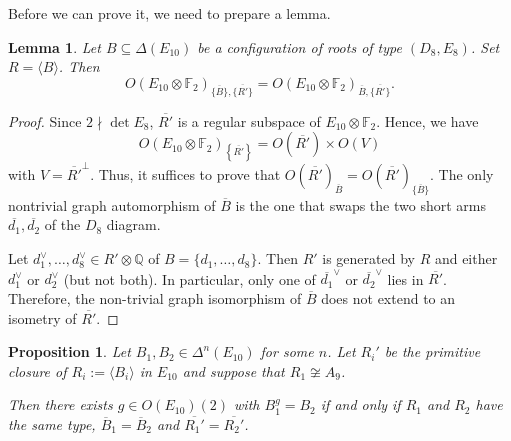 \documentclass[a4paper]{amsart}
\theoremstyle{definition}
\theoremstyle{plain}
\newtheorem{lemma}[definition]{Lemma}
\newtheorem{proposition}[definition]{Proposition}
\newcommand{\QQ}{\mathbb{Q}}
\newcommand{\FF}{\mathbb{F}}
\begin{document}
Before we can prove it, we need to prepare a lemma.
\begin{lemma}\label{lem:D8E8_stabilizer}
Let $B \subseteq \Delta(E_{10})$ be a configuration of roots of type $(D_8,E_8)$. Set $R=\langle B \rangle$.
Then 
\[O(E_{10}\otimes \FF_2)_{\{\overline{B}\},\{\overline{R'}\}}=O(E_{10}\otimes \FF_2)_{\overline{B}, \{\overline{R'}\}}.\]
\end{lemma}
\begin{proof}
Since $2 \nmid \det E_8$, $\overline{R'}$ is a regular subspace of $E_{10}\otimes \FF_2$. Hence, we have 
\[O(E_{10}\otimes \FF_2)_{\left\{\overline{R'}\right\}}=O(\overline{R'})\times O(V)\] 
with $V=\overline{R'}^\perp$. 
Thus, it suffices to prove that $O(\overline{R'})_{\overline{B}}=O(\overline{R'})_{\{\overline{B}\}}$. 
The only nontrivial graph automorphism of $\overline{B}$ is the one that swaps the two short arms $\overline{d_1},\overline{d_2}$ of the $D_8$ diagram. 
\begin{center}
\end{center}
Let $d_1^\vee, \dots, d_8^\vee \in R'\otimes \QQ$ of $B=\{d_1,\ldots,d_8\}$.
Then $R'$ is generated by $R$ and either $d_1^\vee$ or $d_2^\vee$ (but not both). In particular, only one of $\overline{d_1}^\vee$ or $\overline{d_2}^\vee$ lies in $\overline{R'}$. Therefore, the non-trivial graph isomorphism of $\overline{B}$ does not extend to an isometry of $\overline{R'}$.
\end{proof}
\begin{proposition}\label{prop:B-mod2-orbit}
    Let $B_1,B_2 \in \Delta^n(E_{10})$ for some $n$. 
    Let $R_i'$ be the primitive closure of $R_i:= \langle B_i \rangle$ in $E_{10}$ and suppose that $R_1 \not \cong A_9$.
    
    Then there exists $g \in O(E_{10})(2)$ with $B_1^g = B_2$ if and only if $R_1$ and $R_2$ have the same type, $\overline{B}_1=\overline{B}_2$ and $\overline{R_1'}=\overline{R_2'}$.
\end{proposition}
\end{document}
